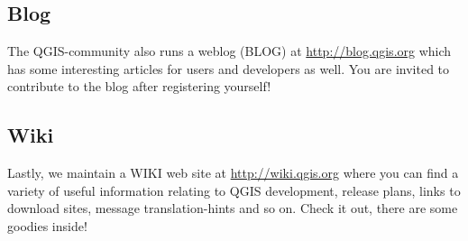 
\subsection{Blog}
The QGIS-community also runs a weblog (BLOG) at \url{http://blog.qgis.org} which has some
interesting articles for users
and developers as well. You are invited to contribute to the blog after registering
yourself!

\subsection{Wiki}
Lastly, we maintain a WIKI web site at \url{http://wiki.qgis.org} where you can find
a variety of useful information relating to QGIS development, release plans,
links to download sites, message translation-hints and so on. 
Check it out, there are some goodies inside!

